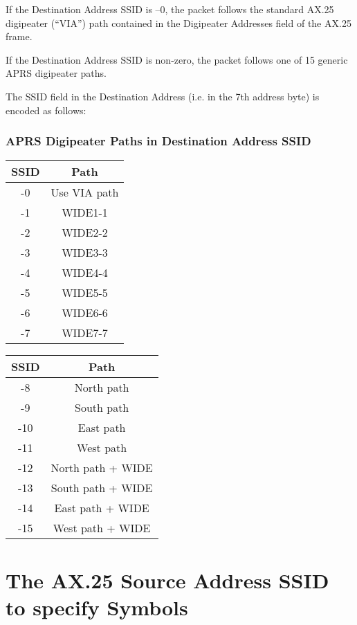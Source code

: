If the Destination Address SSID is –0, the packet follows the standard AX.25
digipeater (“VIA”) path contained in the Digipeater Addresses field of the
AX.25 frame.

If the Destination Address SSID is non-zero, the packet follows one of 15
generic APRS digipeater paths.


The SSID field in the Destination Address (i.e. in the 7th address byte) is
encoded as follows:



\subsubsection*{APRS Digipeater Paths in Destination Address SSID}

\begin{multicols}{2}

      
  \begin{tabular}{|c|c|}
    \hline
    SSID & Path \\       \hline
    -0 & Use VIA path \\ \hline
    -1 & WIDE1-1 \\      \hline
    -2 & WIDE2-2 \\ \hline
    -3 & WIDE3-3 \\ \hline
    -4 & WIDE4-4 \\ \hline
    -5 & WIDE5-5 \\ \hline
    -6 & WIDE6-6 \\ \hline
    -7 & WIDE7-7 \\ \hline
  \end{tabular}
  
  \begin{tabular}{|c|c|}
    \hline
    SSID & Path \\       \hline
    -8 & North path \\ \hline
    -9 & South path \\      \hline
    -10 & East path \\ \hline
    -11 & West path \\ \hline
    -12 & North path + WIDE \\ \hline
    -13 & South path + WIDE \\ \hline
    -14 & East path + WIDE \\ \hline
    -15 & West path + WIDE \\ \hline
  \end{tabular}
\end{multicols}


\section{The AX.25 Source Address SSID to specify Symbols}

